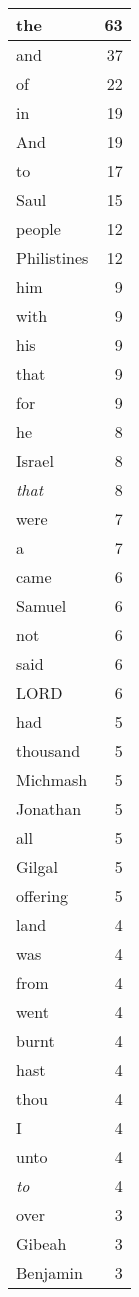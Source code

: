 \begin{center}
\begin{longtable}{l|r}
\hline \hline
\endlastfoot
the & 63 \\ \hline
and & 37 \\ \hline
of & 22 \\ \hline
in & 19 \\ \hline
And & 19 \\ \hline
to & 17 \\ \hline
Saul & 15 \\ \hline
people & 12 \\ \hline
Philistines & 12 \\ \hline
him & 9 \\ \hline
with & 9 \\ \hline
his & 9 \\ \hline
that & 9 \\ \hline
for & 9 \\ \hline
he & 8 \\ \hline
Israel & 8 \\ \hline
\emph{that} & 8 \\ \hline
were & 7 \\ \hline
a & 7 \\ \hline
came & 6 \\ \hline
Samuel & 6 \\ \hline
not & 6 \\ \hline
said & 6 \\ \hline
LORD & 6 \\ \hline
had & 5 \\ \hline
thousand & 5 \\ \hline
Michmash & 5 \\ \hline
Jonathan & 5 \\ \hline
all & 5 \\ \hline
Gilgal & 5 \\ \hline
offering & 5 \\ \hline
land & 4 \\ \hline
was & 4 \\ \hline
from & 4 \\ \hline
went & 4 \\ \hline
burnt & 4 \\ \hline
hast & 4 \\ \hline
thou & 4 \\ \hline
I & 4 \\ \hline
unto & 4 \\ \hline
\emph{to} & 4 \\ \hline
over & 3 \\ \hline
Gibeah & 3 \\ \hline
Benjamin & 3 \\ \hline

\end{longtable}
\end{center}
